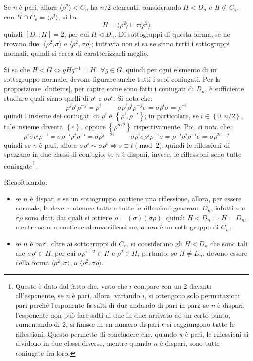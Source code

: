 \documentclass[12pt]{scrartcl}
\theoremstyle{style}
\numberwithin{equation}{subsection}
\begin{document}
Se $n$ \`e pari, allora $\langle \rho ^2  \rangle<C_n$ ha $n / 2$ elementi; considerando $H < D_n$ e $H \not \subset C_n$, con $H\cap C_n = \langle \rho ^2 \rangle$, si ha
\[
H=\langle \rho ^2 \rangle \sqcup \tau  \langle \rho ^2 \rangle
\] 
quindi $[D_n : H] = 2$, per cui $H \lhd D_n$.
Di sottogruppi di questa forma, se ne trovano due: $\langle \rho ^2 , \sigma  \rangle$ e $\langle \rho ^2 , \sigma \rho  \rangle$; tuttavia non si sa se siano tutti i sottogruppi normali, quindi si cerca di caratterizzarli meglio.

Si sa che $H \lhd G \iff gHg^{-1}= H , \ \forall g \in G$, quindi per ogni elemento di un sottogruppo normale, devono figurare anche tutti i suoi coniugati.
Per la proposizione \ref{dnitems}, per capire come sono fatti i coniugati di $D_n$, \`e sufficiente studiare quali siano quelli di $\rho ^i$ e $\sigma \rho ^i$. 
Si nota che:
\[
	\rho ^j \rho ^i \rho ^{-j}= \rho ^i \hspace{1cm}\sigma \rho ^j \rho ^i \rho ^{-j}\sigma  = \sigma \rho ^i\sigma =\rho ^{-i}
\] 
quindi l'insieme dei coniugati di $\rho ^i$ \`e $\left\{ \rho ^i, \rho ^{-i} \right\} $; in particolare, se $i \in \left\{ 0 , n /2 \right\} $, tale insieme diventa $\left\{ e \right\} $, oppure $\left\{ \rho ^{ n / 2}  \right\} $ rispettivamente.
Poi, si nota che:
\[
\rho ^i \sigma \rho ^j \rho ^{-i}= \sigma \rho ^{-i}\rho ^j\rho ^{-i}=\sigma \rho ^{j-2i} \hspace{1cm} \sigma \rho ^i\sigma \rho ^j \rho ^{-i} \sigma = \rho ^{-i}\rho ^j\rho ^{-i}\sigma =\sigma \rho ^{2i-j} 
\] 
quindi se $n$ \`e pari, allora $\sigma \rho ^s \sim \sigma \rho ^t\iff  s\equiv t \pmod{2} $, quindi le riflessioni di spezzano in due classi di coniugio; se $n$ \`e dispari, invece, le riflessioni sono tutte coniugate\footnote{Questo \`e dato dal fatto che, visto che $i$ compare con un $2$ davanti all'esponente, se $n$ \`e pari, allora, variando $i$, si ottengono solo permutazioni pari perch\'e l'esponente fa salti di due andando di pari in pari; se $n$ \`e dispari, l'esponente non pu\`o fare salti di due in due: arrivato ad un certo punto, aumentando di $2$, si finisce in un numero dispari e si raggiungono tutte le riflessioni. Questo permette di concludere che, quando $n$ \`e pari, le riflessioni si dividono in due classi diverse, mentre quando $n$ \`e dispari, sono tutte coniugate fra loro.}.

Ricapitolando: 
\begin{itemize}
	\item se $n$ \`e dispari e se un sottogruppo contiene una riflessione, allora, per essere normale, le deve contenere tutte e tutte le riflessioni generano $D_n$, infatti $\sigma $ e $\sigma \rho $ sono dati, dai quali si ottiene $\rho  = (\sigma )(\sigma \rho) $, quindi $H \lhd D_n \Rightarrow H = D_n$, mentre se non contiene alcuna riflessione, allora \`e un sottogruppo di $C_n$;
	\item se $n$ \`e pari, oltre ai sottogruppi di $C_n$, si considerano gli $H\lhd D_n$ che sono tali che $\sigma \rho ^i \in H$, per cui $\sigma \rho ^{i+2} \in H$ e $\rho ^2 \in H$, pertanto, se $H \neq D_n$, devono essere della forma $\langle \rho ^2,\sigma  \rangle$, o $\langle \rho ^2,\sigma \rho  \rangle$.
\end{itemize}
\end{document}
